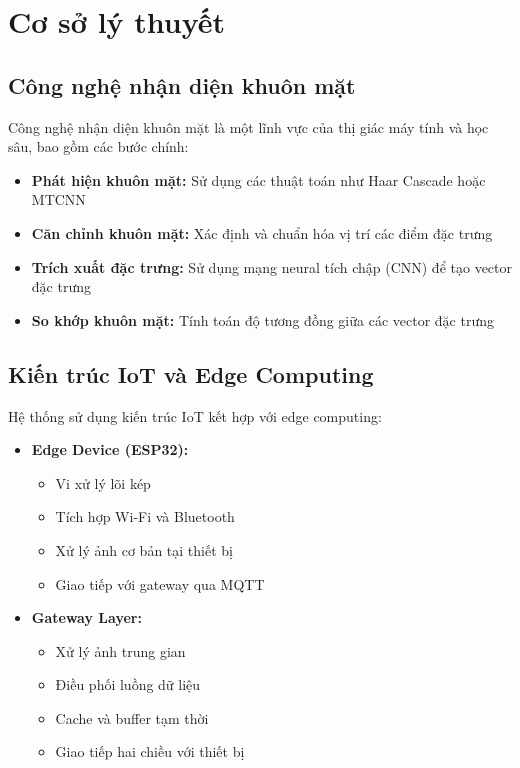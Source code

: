 \section{Cơ sở lý thuyết}

\subsection{Công nghệ nhận diện khuôn mặt}
\hspace{0.5cm}Công nghệ nhận diện khuôn mặt là một lĩnh vực của thị giác máy tính và học sâu, bao gồm các bước chính:

\begin{itemize}
    \item \textbf{Phát hiện khuôn mặt:} Sử dụng các thuật toán như Haar Cascade hoặc MTCNN
    \item \textbf{Căn chỉnh khuôn mặt:} Xác định và chuẩn hóa vị trí các điểm đặc trưng
    \item \textbf{Trích xuất đặc trưng:} Sử dụng mạng neural tích chập (CNN) để tạo vector đặc trưng
    \item \textbf{So khớp khuôn mặt:} Tính toán độ tương đồng giữa các vector đặc trưng
\end{itemize}

\subsection{Kiến trúc IoT và Edge Computing}
\hspace{0.5cm}Hệ thống sử dụng kiến trúc IoT kết hợp với edge computing:

\begin{itemize}
    \item \textbf{Edge Device (ESP32):}
    \begin{itemize}
        \item Vi xử lý lõi kép
        \item Tích hợp Wi-Fi và Bluetooth
        \item Xử lý ảnh cơ bản tại thiết bị
        \item Giao tiếp với gateway qua MQTT
    \end{itemize}
    
    \item \textbf{Gateway Layer:}
    \begin{itemize}
        \item Xử lý ảnh trung gian
        \item Điều phối luồng dữ liệu
        \item Cache và buffer tạm thời
        \item Giao tiếp hai chiều với thiết bị
    \end{itemize}
\end{itemize}

